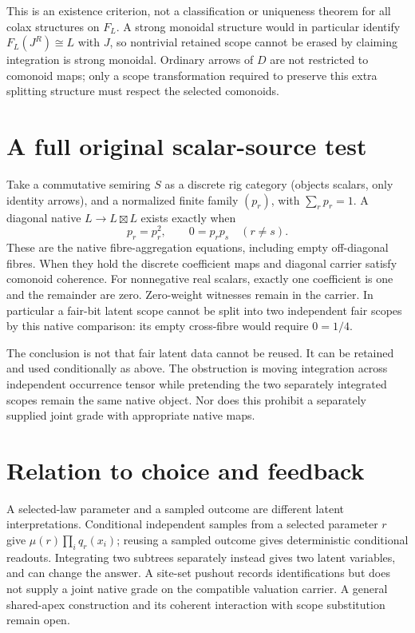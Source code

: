 \documentclass{article}
\begin{document}
This is an existence criterion, not a classification or uniqueness theorem for all colax structures on $F_L$. A strong monoidal structure would in particular identify $F_L(J^R)\cong L$ with $J$, so nontrivial retained scope cannot be erased by claiming integration is strong monoidal. Ordinary arrows of $D$ are not restricted to comonoid maps; only a scope transformation required to preserve this extra splitting structure must respect the selected comonoids.

\section{A full original scalar-source test}
Take a commutative semiring $S$ as a discrete rig category (objects scalars, only identity arrows), and a normalized finite family $(p_r)$, with $\sum_rp_r=1$. A diagonal native $L\to L\boxtimes L$ exists exactly when
\[
 p_r=p_r^2,\qquad 0=p_rp_s\quad(r\ne s).
\]
These are the native fibre-aggregation equations, including empty off-diagonal fibres. When they hold the discrete coefficient maps and diagonal carrier satisfy comonoid coherence. For nonnegative real scalars, exactly one coefficient is one and the remainder are zero. Zero-weight witnesses remain in the carrier. In particular a fair-bit latent scope cannot be split into two independent fair scopes by this native comparison: its empty cross-fibre would require $0=1/4$.

The conclusion is not that fair latent data cannot be reused. It can be retained and used conditionally as above. The obstruction is moving integration across independent occurrence tensor while pretending the two separately integrated scopes remain the same native object. Nor does this prohibit a separately supplied joint grade with appropriate native maps.

\section{Relation to choice and feedback}
A selected-law parameter and a sampled outcome are different latent interpretations. Conditional independent samples from a selected parameter $r$ give $\mu(r)\prod_iq_r(x_i)$; reusing a sampled outcome gives deterministic conditional readouts. Integrating two subtrees separately instead gives two latent variables, and can change the answer. A site-set pushout records identifications but does not supply a joint native grade on the compatible valuation carrier. A general shared-apex construction and its coherent interaction with scope substitution remain open.
\end{document}
